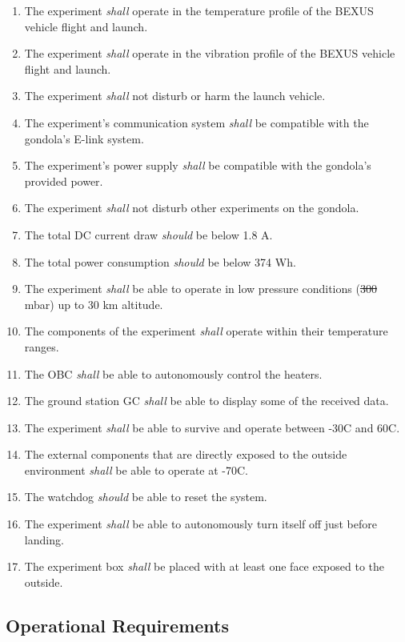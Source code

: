 \documentclass[a4paper,12pt,twoside]{article}
\providecommand{\DIFaddtex}[1]{{\protect\color{blue}\uwave{#1}}} %
\providecommand{\DIFdeltex}[1]{{\protect\color{red}\sout{#1}}}                      %
\providecommand{\DIFaddbegin}{} %
\providecommand{\DIFaddend}{} %
\providecommand{\DIFdelbegin}{} %
\providecommand{\DIFdelend}{} %
\providecommand{\DIFadd}[1]{\texorpdfstring{\DIFaddtex{#1}}{#1}} %
\providecommand{\DIFdel}[1]{\texorpdfstring{\DIFdeltex{#1}}{}} %
\newcommand{\DIFscaledelfig}{0.5}
\newlength{\DIFdelgraphicswidth} %
\newlength{\DIFdelgraphicsheight} %
\newcommand{\DIFaddincludegraphics}[2][]{{\color{blue}\fbox{\DIFOincludegraphics[#1]{#2}}}} %
\newcommand{\DIFdelincludegraphics}[2][]{%
\sbox{\DIFdelgraphicsbox}{\DIFOincludegraphics[#1]{#2}}%
\settoboxwidth{\DIFdelgraphicswidth}{\DIFdelgraphicsbox} %
\settoboxtotalheight{\DIFdelgraphicsheight}{\DIFdelgraphicsbox} %
\scalebox{\DIFscaledelfig}{%
\parbox[b]{\DIFdelgraphicswidth}{\usebox{\DIFdelgraphicsbox}\\[-\baselineskip] \rule{\DIFdelgraphicswidth}{0em}}\llap{\resizebox{\DIFdelgraphicswidth}{\DIFdelgraphicsheight}{%
\setlength{\unitlength}{\DIFdelgraphicswidth}%
\begin{picture}(1,1)%
\thicklines\linethickness{2pt} %
{\color[rgb]{1,0,0}\put(0,0){\framebox(1,1){}}}%
{\color[rgb]{1,0,0}\put(0,0){\line( 1,1){1}}}%
{\color[rgb]{1,0,0}\put(0,1){\line(1,-1){1}}}%
\end{picture}%
}\hspace*{3pt}}} %
} %
\DeclareRobustCommand{\DIFaddbegin}{\DIFOaddbegin \let\includegraphics\DIFaddincludegraphics} %
\DeclareRobustCommand{\DIFaddend}{\DIFOaddend \let\includegraphics\DIFOincludegraphics} %
\DeclareRobustCommand{\DIFdelbegin}{\DIFOdelbegin \let\includegraphics\DIFdelincludegraphics} %
\DeclareRobustCommand{\DIFdelend}{\DIFOaddend \let\includegraphics\DIFOincludegraphics} %
\begin{document}
\begin{enumerate}[label=D.\arabic*]
    \item The experiment \textit{shall} operate in the temperature profile of the BEXUS vehicle flight and launch.
    \item The experiment \textit{shall} operate in the vibration profile of the BEXUS vehicle flight and launch.
    \item The experiment \textit{shall} not disturb or harm the launch vehicle.
    \item The experiment's communication system \textit{shall} be compatible with the gondola's E-link system.
    \item The experiment's power supply \textit{shall} be compatible with the gondola's provided power.
    \item The experiment \textit{shall} not disturb other experiments on the gondola.
    \item The total DC current draw \textit{should} be below 1.8 A.
    \item The total power consumption \textit{should} be below 374 Wh.
    \item The experiment \textit{shall} be able to operate in low pressure conditions (\DIFdelbegin \DIFdel{300 }\DIFdelend \DIFaddbegin \DIFadd{10-15 }\DIFaddend mbar) up to 30 km altitude.
    \item The components of the experiment \textit{shall} operate within their temperature ranges.
    \item The OBC \textit{shall} be able to autonomously control the heaters.
    \item The ground station GC \textit{shall} be able to display some of the received data.
    \item The experiment \textit{shall} be able to survive and operate between -30\degree C and 60\degree C.
    \item The external components that are directly exposed to the outside environment \textit{shall} be able to operate at -70\degree C.
    \item The watchdog \textit{should} be able to reset the system.
    \item The experiment \textit{shall} be able to autonomously turn itself off just before landing.
    \item The experiment box \textit{shall} be placed with at least one face exposed to the outside. 
\end{enumerate}
\pagebreak
\pagebreak
\subsection{Operational Requirements}
\end{document}
